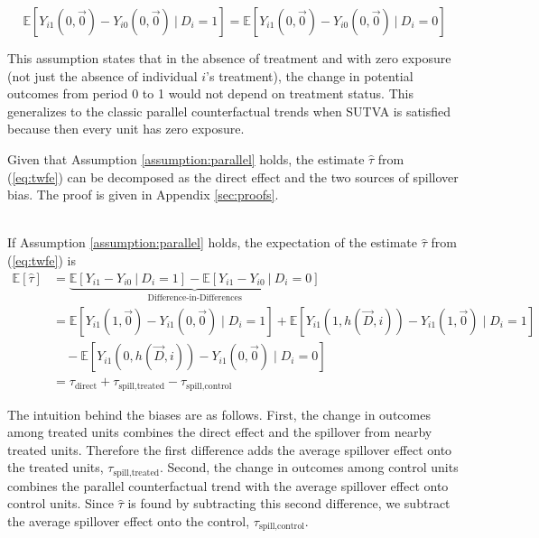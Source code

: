 \documentclass[11pt]{article}
\begin{document}
\begin{assumption}\label{assumption:parallel}
    \[ 
        \mathbb{E}\left[ Y_{i1}(0, \vec{0}) - Y_{i0}(0, \vec{0}) \ \vert \ D_i = 1 \right] = 
        \mathbb{E}\left[ Y_{i1}(0, \vec{0}) - Y_{i0}(0, \vec{0}) \ \vert \ D_i = 0 \right]
    \]
\end{assumption}
This assumption states that in the absence of treatment and with zero exposure (not just the absence of individual $i$'s treatment), the change in potential outcomes from period 0 to 1 would not depend on treatment status. This generalizes to the classic parallel counterfactual trends when SUTVA is satisfied because then every unit has zero exposure.

Given that Assumption \ref{assumption:parallel} holds, the estimate $\hat{\tau}$ from (\ref{eq:twfe}) can be decomposed as the direct effect and the two sources of spillover bias. The proof is given in Appendix \ref{sec:proofs}.

\begin{proposition}\label{thm:bias}\ \\    
    If Assumption \ref{assumption:parallel} holds, the expectation of the estimate $\hat{\tau}$ from (\ref{eq:twfe}) is
    \begin{align*}
        \mathbb{E}[\hat{\tau}] &= \underbrace{\mathbb{E}\left[ Y_{i1} - Y_{i0} \ \vert \ D_i = 1 \right] - \mathbb{E}\left[ Y_{i1} - Y_{i0} \ \vert \ D_i = 0 \right]}_{\text{Difference-in-Differences}} \\ 
        &= 
        \mathbb{E} \left[ Y_{i1}(1, \vec{0}) - Y_{i1}(0, \vec{0}) \mid D_i = 1 \right] + \mathbb{E} \left[ Y_{i1}(1, h(\vec{D}, i)) - Y_{i1}(1, \vec{0}) \mid D_i = 1 \right] \\
        &\quad - \mathbb{E} \left[ Y_{i1}(0, h(\vec{D}, i)) - Y_{i1}(0, \vec{0}) \mid D_i = 0 \right] \\
        &= \tau_{\text{direct}} + \tau_{\text{spill,treated}} - \tau_{\text{spill,control}}
    \end{align*}
\end{proposition}

The intuition behind the biases are as follows. First, the change in outcomes among treated units combines the direct effect and the spillover from nearby treated units. Therefore the first difference adds the average spillover effect onto the treated units, $\tau_{\text{spill,treated}}$. Second, the change in outcomes among control units combines the parallel counterfactual trend with the average spillover effect onto control units. Since $\hat{\tau}$ is found by subtracting this second difference, we subtract the average spillover effect onto the control, $\tau_{\text{spill,control}}$. 
\end{document}
